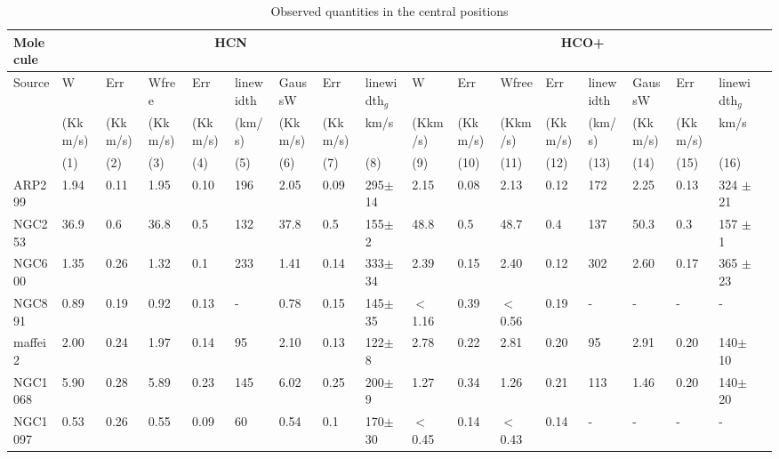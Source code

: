 \documentclass[legal,11pt]{article}
\begin{document}
\begin{landscape}
\begin{table}
\caption{ Observed quantities in the central positions} 
\label{tab:stack}
\centering
\scriptsize
\begin{tabular}{l l l l l l l l l l l l l l l l l l }
\hline
\toprule
Molecule &  \multicolumn{8}{c}{HCN} & \multicolumn{8}{c}{HCO+}\\
\midrule
Source     & W       & Err     & Wfree   & Err     & linewidth & GaussW  & Err     & linewidth$_g$ & W       & Err     & Wfree   & Err     & linewidth & GaussW  & Err     & linewidth$_g$ \\
           & (Kkm/s) & (Kkm/s) & (Kkm/s) & (Kkm/s) & (km/s)    & (Kkm/s) & (Kkm/s) & km/s          & (Kkm/s) & (Kkm/s) & (Kkm/s) & (Kkm/s) & (km/s)    & (Kkm/s) & (Kkm/s) & km/s          \\
           &(1)      & (2)     & (3)     & (4)     & (5)       & (6)     & (7)     & (8)           & (9)     & (10)    & (11)    & (12)    & (13)      & (14)    & (15)    & (16)          \\ 
\hline
ARP299     & 1.94    & 0.11    & 1.95    & 0.10    & 196       & 2.05    & 0.09    & 295$\pm$14    & 2.15    & 0.08    & 2.13    & 0.12    & 172       & 2.25    & 0.13    & 324 $\pm$21   \\
NGC253     & 36.9    & 0.6     & 36.8    & 0.5     & 132       & 37.8    & 0.5     & 155$\pm$2     & 48.8    & 0.5     & 48.7    & 0.4     & 137       & 50.3    & 0.3     & 157 $\pm$ 1   \\
NGC600     & 1.35    & 0.26    & 1.32    & 0.1     & 233       & 1.41    & 0.14    & 333$\pm$34    & 2.39    & 0.15    & 2.40    & 0.12    & 302       & 2.60    & 0.17    & 365 $\pm$ 23  \\
NGC891     & 0.89    & 0.19    & 0.92    & 0.13    & -         & 0.78    & 0.15    & 145$\pm$35    & $<$1.16 & 0.39    & $<$0.56 & 0.19    & -         & -       & -       & -             \\
maffei2    & 2.00    & 0.24    & 1.97    & 0.14    & 95        & 2.10    & 0.13    & 122$\pm$8     & 2.78    & 0.22    & 2.81    & 0.20    & 95        & 2.91    & 0.20    & 140$\pm$10    \\
NGC1068    & 5.90    & 0.28    & 5.89    & 0.23    & 145       & 6.02    & 0.25    & 200$\pm$9     & 1.27    & 0.34    & 1.26    & 0.21    & 113       & 1.46    & 0.20    & 140$\pm$20    \\
NGC1097    & 0.53    & 0.26    & 0.55    & 0.09    & 60        & 0.54    & 0.1     & 170$\pm$30    & $<$0.45 & 0.14    & $<$0.43 & 0.14    & -         & -       & -       & -             \\

\end{tabular}
\end{table}
\end{landscape}
\end{document}
